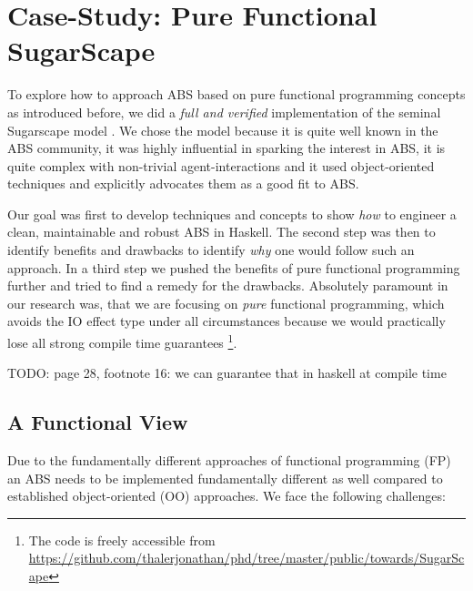 \section{Case-Study: Pure Functional SugarScape}
\label{sec:case_study}

To explore how to approach ABS based on pure functional programming concepts as introduced before, we did a \textit{full and verified} implementation of the seminal Sugarscape model \cite{epstein_growing_1996}. We chose the model because it is quite well known in the ABS community, it was highly influential in sparking the interest in ABS, it is quite complex with non-trivial agent-interactions and it used object-oriented techniques and explicitly advocates them as a good fit to ABS. 

Our goal was first to develop techniques and concepts to show \textit{how} to engineer a clean, maintainable and robust ABS in Haskell. The second step was then to identify benefits and drawbacks to identify \textit{why} one would follow such an approach. In a third step we pushed the benefits of pure functional programming further and tried to find a remedy for the drawbacks. Absolutely paramount in our research was, that we are focusing on \textit{pure} functional programming, which avoids the IO effect type under all circumstances because we would practically lose all strong compile time guarantees \footnote{The code is freely accessible from \url{https://github.com/thalerjonathan/phd/tree/master/public/towards/SugarScape}}.

TODO: page 28, footnote 16: we can guarantee that in haskell at compile time

\subsection{A Functional View}
Due to the fundamentally different approaches of functional programming (FP) an ABS needs to be implemented fundamentally different as well compared to established object-oriented (OO) approaches. We face the following challenges:

